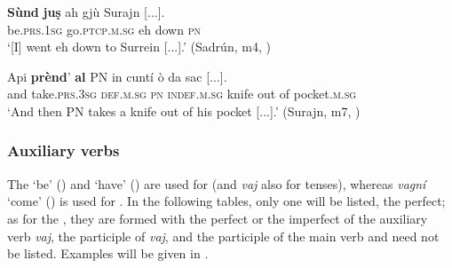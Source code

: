 \ea
\label{ex:euph2}
\gll   \textbf{Sùnd} \textbf{juṣ} ah gjù Surajn [...]. \\
be.\textsc{prs.1sg} go.\textsc{ptcp.m.sg} eh down \textsc{pn}\\
\glt `[I] went eh down to Surrein [...].' (Sadrún, m4, )
\z

\ea
\label{ex:euph3}
\gll  Api \textbf{prènd}’ \textbf{al} \textsc{PN} in cuntí ò da sac [...].\\
and take.\textsc{prs.3sg} \textsc{def.m.sg} \textsc{pn} \textsc{indef.m.sg} knife out of pocket.\textsc{m.sg}\\
\glt `And then \textsc{PN} takes a knife out of his pocket [...].' (Surajn, m7, )
\z


\subsubsection{Auxiliary verbs}\label{sec:4.1.1.1}
The   `be' () and  `have' () are used for  (and \textit{vaj} also for  tenses), whereas \textit{vagní} `come' () is used for . In the following tables, only one  will be listed, the perfect; as for the , they are formed with the perfect or the imperfect of the auxiliary verb \textit{vaj}, the participle of \textit{vaj}, and the participle of the main verb and need not be listed. Examples will be given in .

